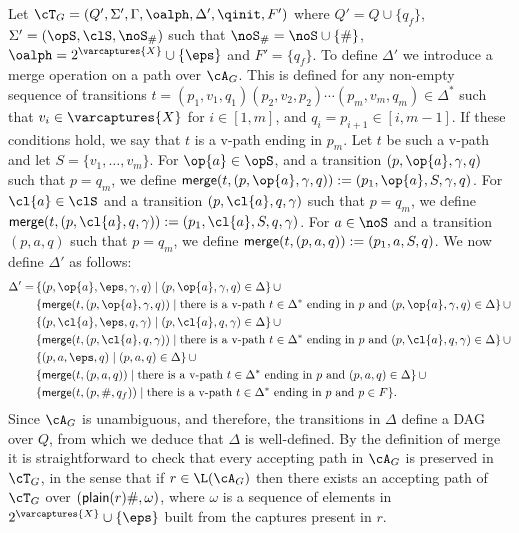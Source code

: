 Let $\cT_G = (Q', \Sigma', \Gamma, \oalph, \Delta', \qinit, F')$ 
where $Q' = Q\cup\{q_f\}$, 
$\Sigma' = (\opS,\clS,\noS_{\#})$ 
such that $\noS_{\#} = \noS\cup\{\#\}$, $\oalph = 2^{\varcaptures{X}}\cup\{\eps\}$ and $F' = \{q_f\}$. 
To define $\Delta'$ we introduce a {\sf merge} operation on a path over $\cA_G$. 
This is defined for any non-empty sequence of transitions $t = (p_1,v_1,q_1)(p_2,v_2,p_2)\cdots(p_m,v_m,q_m)\in\Delta^*$ such that $v_i\in\varcaptures{X}$ for $i\in[1,m]$, and $q_i = p_{i+1}\in[i,m-1]$. 
If these conditions hold, we say that $t$ is a v-path ending in $p_m$. 
Let $t$ be such a v-path and let $S = \{v_1,\ldots,v_m\}$. For $\op{a}\in\opS$, and a transition $(p,\op{a},\gamma,q)$ such that $p = q_m$, we define ${\sf merge}(t, (p,\op{a},\gamma,q)) := (p_1,\op{a},S,\gamma,q)$. For $\cl{a}\in\clS$ and a transition $(p,\cl{a},q,\gamma)$ such that $p = q_m$, we define ${\sf merge}(t,(p,\cl{a},q,\gamma)) := (p_1,\cl{a},S,q,\gamma)$. For $a\in\noS$ and a transition $(p,a,q)$ such that $p = q_m$, we define ${\sf merge}(t,(p,a,q)) := (p_1,a,S,q)$. We now define $\Delta'$ as follows:
\begin{align*}
	\Delta' = \,&\{(p,\op{a},\eps,\gamma,q)\mid (p,\op{a},\gamma,q)\in\Delta\}\,\cup\\
	&\{{\sf merge}(t,(p,\op{a},\gamma,q))\mid\text{there is a v-path $t\in\Delta^*$ ending in $p$ and }(p,\op{a},\gamma,q)\in\Delta\}\,\cup\\
	&\{(p,\cl{a},\eps,q,\gamma)\mid (p,\cl{a},q,\gamma)\in\Delta\}\,\cup\\
	&\{{\sf merge}(t,(p,\cl{a},q,\gamma))\mid\text{there is a v-path $t\in\Delta^*$ ending in $p$ and }(p,\cl{a},q,\gamma)\in\Delta\}\,\cup\\
	&\{(p,a,\eps,q)\mid (p,a,q)\in\Delta\}\, \cup\\
	&\{{\sf merge}(t,(p,a,q))\mid\text{there is a v-path $t\in\Delta^*$ ending in $p$ and }(p,a,q)\in\Delta\}\,\cup\\
	&\{{\sf merge}(t,(p,\#,q_f))\mid\text{there is a v-path $t\in\Delta^*$ ending in $p$ and } p\in F\}.
\end{align*}
Since $\cA_G$ is unambiguous, and therefore, the transitions in $\Delta$ define a DAG over $Q$, from which we deduce that $\Delta$ is well-defined.
By the definition of {\sf merge} it is straightforward to check that every accepting path in $\cA_G$ is preserved in $\cT_G$, in the sense that if $r\in\L(\cA_G)$ then there exists an accepting path of $\cT_G$ over $({\sf plain}(r)\#, \omega)$, where $\omega$ is a sequence of elements in $2^{\varcaptures{X}}\cup\{\eps\}$ built from the captures present in $r$.

